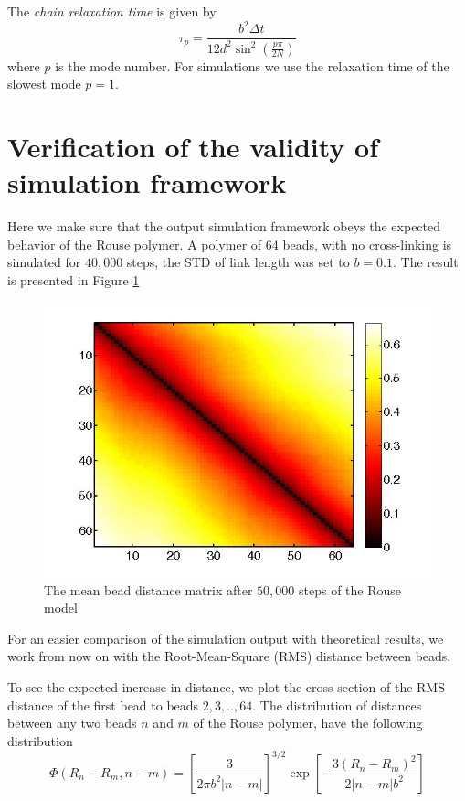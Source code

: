 \documentclass[12pt]{book}
\begin{document}
The \textit{chain relaxation time} is given by 
\begin{equation*}
\tau_p = \frac{b^2\Delta t}{12d^2\sin^2(\frac{p\pi}{2N})}
\end{equation*}
where $p$ is the mode number. For simulations we use the relaxation time of the slowest mode $p=1$.

\section{Verification of the validity of simulation framework}
Here we make sure that the output simulation framework obeys the expected behavior of the Rouse polymer. 
A polymer of 64 beads, with no cross-linking is simulated for $40,000$ steps, the STD of link length was set to $b=0.1$. The result is presented in Figure \ref{figure_vereficationOfModelDistanceMatrix64Beads}

\begin{figure}[H]
\includegraphics[scale=0.3]{distanceMatrix64Beads}
\caption{\scriptsize{The mean bead distance matrix after $50,000$ steps of the Rouse model}}
\label{figure_vereficationOfModelDistanceMatrix64Beads}
\end{figure}

For an easier comparison of the simulation output with theoretical results, we work from now on with the Root-Mean-Square (RMS) distance between beads. 

To see the expected increase in distance, we plot the cross-section of the RMS distance of the first bead to beads $2,3,..,64$. The distribution of distances between any two beads $n$ and $m$ of the Rouse polymer, have the following distribution
\begin{equation}
\Phi(R_n-R_m,n-m)=\left[\frac{3}{2\pi b^2|n-m|} \right]^{3/2}\exp{\left[-\frac{3(R_n-R_m)^2}{2|n-m|b^2} \right]}
\end{equation}
\end{document}
